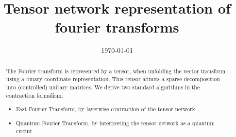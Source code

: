 \documentclass[aps,onecolumn,nofootinbib,pra]{article}
\begin{document}
    \title{Tensor network representation of fourier transforms}

    \maketitle
    \date{\today}

    \begin{abstract}
        The Fourier transform is represented by a tensor, when unfolding the vector transform using a binary coordinate representation.
        This tensor admits a sparse decomposition into (controlled) unitary matrices.
        We derive two standard algorithms in the contraction formalism:
        \begin{itemize}
            \item Fast Fourier Transform, by layerwise contraction of the tensor network
            \item Quantum Fourier Transform, by interpreting the tensor network as a quantum circuit
        \end{itemize}
    \end{abstract}


    
    
    
    
    
    

    
    
\end{document}
